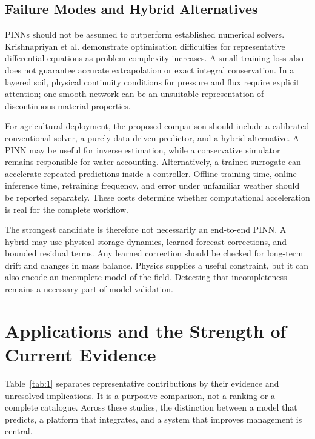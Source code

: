 \documentclass[acmsmall,screen,nonacm]{acmart}
\begin{document}
\subsection{Failure Modes and Hybrid Alternatives}

\label{sec:6-2}

PINNs should not be assumed to outperform established numerical solvers. Krishnapriyan et al. \cite{R17} demonstrate optimisation difficulties for representative differential equations as problem complexity increases. A small training loss also does not guarantee accurate extrapolation or exact integral conservation. In a layered soil, physical continuity conditions for pressure and flux require explicit attention; one smooth network can be an unsuitable representation of discontinuous material properties.

For agricultural deployment, the proposed comparison should include a calibrated conventional solver, a purely data-driven predictor, and a hybrid alternative. A PINN may be useful for inverse estimation, while a conservative simulator remains responsible for water accounting. Alternatively, a trained surrogate can accelerate repeated predictions inside a controller. Offline training time, online inference time, retraining frequency, and error under unfamiliar weather should be reported separately. These costs determine whether computational acceleration is real for the complete workflow.

The strongest candidate is therefore not necessarily an end-to-end PINN. A hybrid may use physical storage dynamics, learned forecast corrections, and bounded residual terms. Any learned correction should be checked for long-term drift and changes in mass balance. Physics supplies a useful constraint, but it can also encode an incomplete model of the field. Detecting that incompleteness remains a necessary part of model validation.

\section{Applications and the Strength of Current Evidence}

\label{sec:7}

Table~\ref{tab:1} separates representative contributions by their evidence and unresolved implications. It is a purposive comparison, not a ranking or a complete catalogue. Across these studies, the distinction between a model that predicts, a platform that integrates, and a system that improves management is central.
\end{document}
